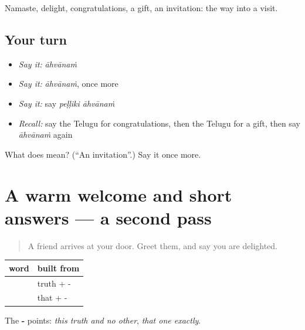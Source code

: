 \begin{grammarlens}[title={What you've built}]
Namaste, delight, congratulations, a gift, an invitation: the way into a visit.
\end{grammarlens}

\subsection*{Your turn}
\begin{itemize}
\raggedright
  \item \emph{Say it:} \emph{āhvānaṁ}
  \item \emph{Say it:} \emph{āhvānaṁ}, once more
  \item \emph{Say it:} say \emph{peḷḷiki āhvānaṁ}
  \item \emph{Recall:} say the Telugu for congratulations, then the Telugu for a gift, then say \emph{āhvānaṁ} again
\end{itemize}

\begin{tcolorbox}[breakable,colback=teal!4,colframe=teal!35!black,title={Before you move on}]
What does  mean? (\textquotedblleft{}An invitation\textquotedblright{}.) Say it once more.
\end{tcolorbox}
\section[(dialogue)]{A warm welcome and short answers — a second pass}

\label{lesson:TE-R99-second-pass-welcome}



\begin{quote}
A friend arrives at your door. Greet them, and say you are delighted.
\end{quote}

\begin{grammarlens}[title={Grammar Lens: the ending -\te{ఏ}, \textquotedblleft{}exactly this\textquotedblright{}}]
\noindent
\begin{tabularx}{\linewidth}{@{}>{\raggedright\arraybackslash}X>{\raggedright\arraybackslash}X@{}}
\toprule
\textbf{word} & \textbf{built from} \\
\midrule
\textbf{\te{నిజమే}} & truth + -\te{ఏ} \\
\textbf{\te{అదే}} & that + -\te{ఏ} \\
\bottomrule
\end{tabularx}

The \textbf{-} points: \emph{this truth and no other}, \emph{that one exactly}.
\end{grammarlens}

